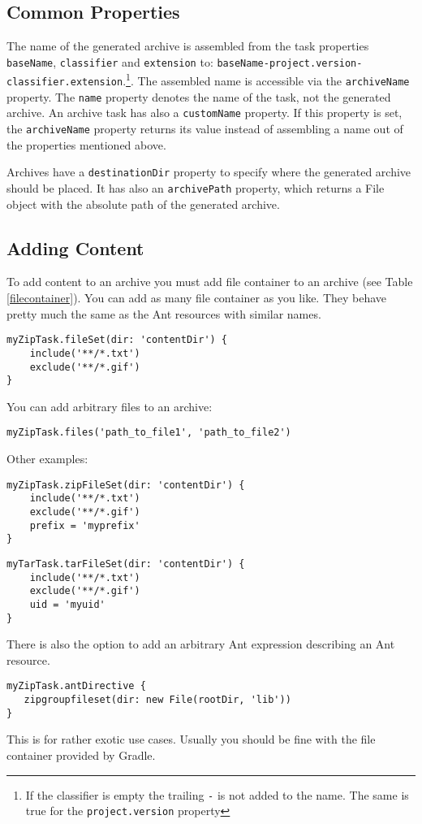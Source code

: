 \subsection{Common Properties} %
\label{sub:common_properties}
The name of the generated archive is assembled from the task properties \texttt{baseName}, \texttt{classifier} and \texttt{extension} to: \texttt{baseName-project.version-classifier.extension}.\footnote{If the classifier is empty the trailing \texttt{-} is not added to the name. The same is true for the \texttt{project.version} property}. The assembled name is accessible via the \texttt{archiveName} property. The \texttt{name} property denotes the name of the task, not the generated archive. An archive task has also a \texttt{customName} property. If this property is set, the \texttt{archiveName} property returns its value instead of assembling a name out of the properties mentioned above.

Archives have a \texttt{destinationDir} property to specify where the generated archive should be placed. It has also an \texttt{archivePath} property, which returns a File object with the absolute path of the generated archive.

\subsection{Adding Content} %
\label{sub:adding_content}
To add content to an archive you must add file container to an archive (see Table \ref{filecontainer}). You can add as many file container as you like. They behave pretty much the same as the Ant resources with similar names. 
\begin{Verbatim}
myZipTask.fileSet(dir: 'contentDir') {
	include('**/*.txt')
	exclude('**/*.gif')
}
\end{Verbatim}
You can add arbitrary files to an archive:
\begin{Verbatim}
myZipTask.files('path_to_file1', 'path_to_file2')
\end{Verbatim}
Other examples:
\begin{Verbatim}
myZipTask.zipFileSet(dir: 'contentDir') {
	include('**/*.txt')
	exclude('**/*.gif')
	prefix = 'myprefix'
}
\end{Verbatim}

\begin{Verbatim}
myTarTask.tarFileSet(dir: 'contentDir') {
	include('**/*.txt')
	exclude('**/*.gif')
	uid = 'myuid'
}
\end{Verbatim}
There is also the option to add an arbitrary Ant expression describing an Ant resource.
\begin{Verbatim}
myZipTask.antDirective {        
   zipgroupfileset(dir: new File(rootDir, 'lib'))    
}
\end{Verbatim}
This is for rather exotic use cases. Usually you should be fine with the file container provided by Gradle.  

